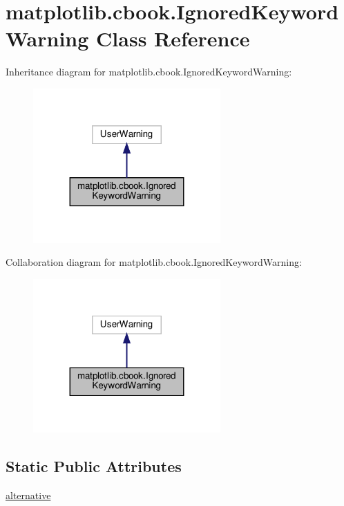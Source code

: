 \hypertarget{classmatplotlib_1_1cbook_1_1IgnoredKeywordWarning}{}\section{matplotlib.\+cbook.\+Ignored\+Keyword\+Warning Class Reference}
\label{classmatplotlib_1_1cbook_1_1IgnoredKeywordWarning}


Inheritance diagram for matplotlib.\+cbook.\+Ignored\+Keyword\+Warning\+:
\nopagebreak
\begin{figure}[H]
\begin{center}
\leavevmode
\includegraphics[width=203pt]{classmatplotlib_1_1cbook_1_1IgnoredKeywordWarning__inherit__graph}
\end{center}
\end{figure}


Collaboration diagram for matplotlib.\+cbook.\+Ignored\+Keyword\+Warning\+:
\nopagebreak
\begin{figure}[H]
\begin{center}
\leavevmode
\includegraphics[width=203pt]{classmatplotlib_1_1cbook_1_1IgnoredKeywordWarning__coll__graph}
\end{center}
\end{figure}
\subsection*{Static Public Attributes}
\begin{DoxyCompactItemize}
\item 
\hyperlink{classmatplotlib_1_1cbook_1_1IgnoredKeywordWarning_a519fd686c76b4f12af00217eb5876d3b}{alternative}
\end{DoxyCompactItemize}


